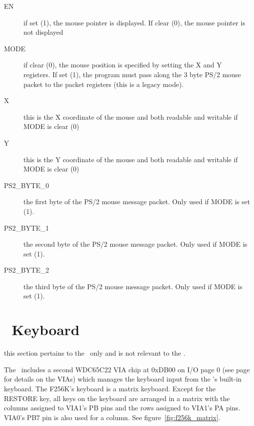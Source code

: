 \begin{description}
    \item[EN] if set (1), the mouse pointer is displayed. If clear (0), the mouse pointer is not displayed
    \item[MODE] if clear (0), the mouse position is specified by setting the X and Y registers. If set (1), the program must pass along the 3 byte PS/2 mouse packet to the packet registers (this is a legacy mode).
    \item[X] this is the X coordinate of the mouse and both readable and writable if MODE is clear (0)
    \item[Y] this is the Y coordinate of the mouse and both readable and writable if MODE is clear (0)
    \item[PS2\_BYTE\_0] the first byte of the PS/2 mouse message packet. Only used if MODE is set (1).
    \item[PS2\_BYTE\_1] the second byte of the PS/2 mouse message packet. Only used if MODE is set (1).
    \item[PS2\_BYTE\_2] the third byte of the PS/2 mouse message packet. Only used if MODE is set (1).
\end{description}

\section*{\fk\ Keyboard}
\label{sec_f256k_kbd}

\begin{note}
    this section pertains to the \fk\ only and is not relevant to the \jr.
\end{note}

The \fk\ includes a second WDC65C22 VIA chip at 0xDB00 on I/O page 0 (see page \pageref{chap_via} for details on the VIAs) which manages the keyboard input from the \fk's built-in keyboard. The F256K's keyboard is a matrix keyboard. Except for the RESTORE key, all keys on the keyboard are arranged in a matrix with the columns assigned to VIA1's PB pins and the rows assigned to VIA1's PA pins. VIA0's PB7 pin is also used for a column. See figure~\ref{fig:f256k_matrix}.

